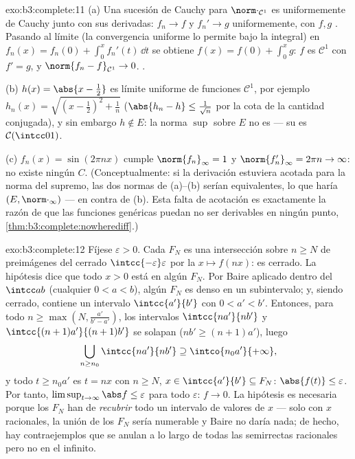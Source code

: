 \begin{solution}{exo:b3:complete:11}
(a) Una sucesión de Cauchy para $\norm\cdot_{\mathcal C^1}$ es
uniformemente de Cauchy junto con sus derivadas: $f_n \to f$ y
$f_n' \to g$ uniformemente, con $f, g$
. Pasando al límite (la
convergencia uniforme lo permite bajo la integral) en
$f_n(x) = f_n(0) + \int_0^xf_n'(t)\,\dd t$ se obtiene
$f(x) = f(0) + \int_0^xg$: $f$ es $\mathcal C^1$ con $f' = g$, y
$\norm{f_n - f}_{\mathcal C^1} \to 0$.
.

(b) $h(x) = \abs{x - \frac12}$ es límite uniforme de funciones
$\mathcal C^1$, por ejemplo $h_n(x) = \sqrt{(x -
\frac12)^2 + \frac1n}$ ($\abs{h_n - h} \leq \frac1{\sqrt n}$ por la cota
de la cantidad conjugada), y sin embargo $h \notin E$: la norma $\sup$
sobre $E$ no es  --- su
 es
$\mathcal C(\intcc01)$.

(c) $f_n(x) = \sin(2\pi nx)$ cumple $\norm{f_n}_\infty = 1$ y
$\norm{f_n'}_\infty = 2\pi n \to \infty$: no existe ningún $C$.
(Conceptualmente: si la derivación estuviera acotada para la norma del
supremo, las dos normas de (a)--(b) serían equivalentes, lo que haría
$(E, \norm\cdot_\infty)$  ---
en contra de (b). Esta falta de acotación es exactamente la razón de que
las funciones  genéricas
puedan no ser derivables en ningún punto,
\cref{thm:b3:complete:nowherediff}.)
\end{solution}

\begin{solution}{exo:b3:complete:12}
Fíjese $\varepsilon > 0$. Cada $F_N$ es una intersección sobre $n
\geq N$ de preimágenes del cerrado $\intcc{-\varepsilon}
\varepsilon$ por la  $x \mapsto f(nx)$: es
cerrado. La hipótesis dice que todo $x > 0$ está en algún $F_N$. Por
Baire aplicado dentro del 
$\intcc ab$ (cualquier $0 < a <
b$), algún $F_N$ es denso en un subintervalo; y, siendo cerrado,
contiene un intervalo $\intcc{a'}{b'}$ con $0 < a' < b'$. Entonces, para
todo $n \geq \max(N, \frac{a'}{b' - a'})$, los intervalos
$\intcc{na'}{nb'}$ y $\intcc{(n+1)a'}{(n+1)b'}$ se solapan
($nb' \geq (n+1)a'$), luego
\[
\bigcup_{n \geq n_0}\intcc{na'}{nb'} \supseteq
\intco{n_0a'}{+\infty},
\]
y todo $t \geq n_0a'$ es $t = nx$ con $n \geq N$, $x \in
\intcc{a'}{b'} \subseteq F_N$: $\abs{f(t)} \leq \varepsilon$. Por tanto,
$\limsup_{t\to\infty}\abs f \leq \varepsilon$ para todo $\varepsilon$:
$f \to 0$. La hipótesis  es necesaria porque los $F_N$ han de
\emph{recubrir} todo un intervalo de valores de $x$ --- solo con $x$
racionales, la unión de los $F_N$ sería numerable y Baire no daría nada;
de hecho, hay contraejemplos
 que se anulan a lo largo
de todas las semirrectas racionales pero no en el infinito.
\end{solution}

